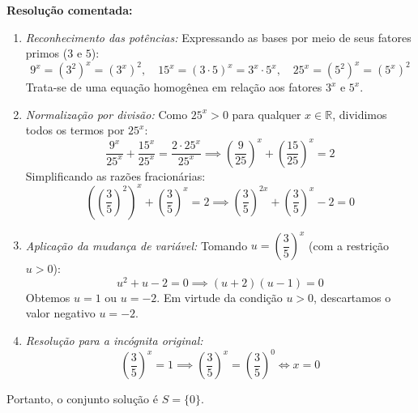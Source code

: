 \documentclass[12pt,a4paper]{report}
\begin{document}
	\textbf{Resolução comentada:}
	\begin{enumerate}[label=\alph*)]
		\item \textit{Reconhecimento das potências:}
		Expressando as bases por meio de seus fatores primos ($3$ e $5$):
		\[
		9^x = (3^2)^x = (3^x)^2, \quad 15^x = (3 \cdot 5)^x = 3^x \cdot 5^x, \quad 25^x = (5^2)^x = (5^x)^2
		\]
		Trata-se de uma equação homogênea em relação aos fatores $3^x$ e $5^x$.
		\item \textit{Normalização por divisão:}
		Como $25^x > 0$ para qualquer $x \in \mathbb{R}$, dividimos todos os termos por $25^x$:
		\[
		\frac{9^x}{25^x} + \frac{15^x}{25^x} = \frac{2 \cdot 25^x}{25^x} \implies \left(\frac{9}{25}\right)^x + \left(\frac{15}{25}\right)^x = 2
		\]
		Simplificando as razões fracionárias:
		\[
		\left(\left(\frac{3}{5}\right)^2\right)^x + \left(\frac{3}{5}\right)^x = 2 \implies \left(\frac{3}{5}\right)^{2x} + \left(\frac{3}{5}\right)^x - 2 = 0
		\]
		\item \textit{Aplicação da mudança de variável:}
		Tomando $u = \left(\dfrac{3}{5}\right)^x$ (com a restrição $u > 0$):
		\[
		u^2 + u - 2 = 0 \implies (u + 2)(u - 1) = 0
		\]
		Obtemos $u = 1$ ou $u = -2$. Em virtude da condição $u > 0$, descartamos o valor negativo $u = -2$.
		\item \textit{Resolução para a incógnita original:}
		\[
		\left(\frac{3}{5}\right)^x = 1 \implies \left(\frac{3}{5}\right)^x = \left(\frac{3}{5}\right)^0 \iff x = 0
		\]
	\end{enumerate}
	Portanto, o conjunto solução é $S = \{0\}$.
	
\end{document}
